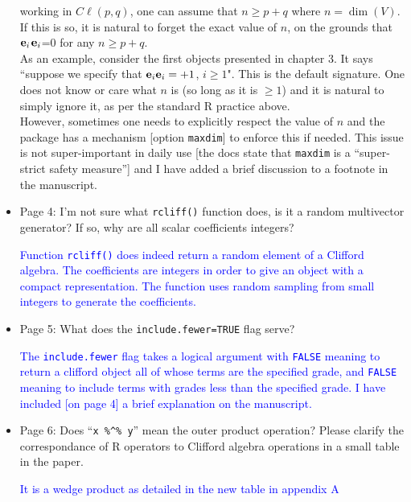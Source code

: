 \documentclass{article}
\newcommand{\cliff}[1]{\ensuremath{C\ell\left(#1\right)}}
\newcommand{\ei}[1]{\ensuremath{{\bf e}_{#1}}}
\begin{document}
\begin{itemize}
{working in $\cliff{p,q}$, one can assume that $n\geq p+q$ where
$n=\dim(V)$.  If this is so, it is natural to forget the exact value of
$n$, on the grounds that \ei{i}\ei{i}=0 for any $n\geq p+q$.\\
As an example, consider the first objects presented in chapter 3.  It
says ``suppose we specify that $\ei{i}\ei{i}=+1$, $i\geq 1$".  This is
the default signature.  One does not know or care what $n$ is (so long
as it is $\geq 1$) and it is natural to simply ignore it, as per
the standard R practice above.\\
However, sometimes one needs to explicitly respect the value of $n$
and the package has a mechanism [option {\tt maxdim}] to enforce this
if needed.  This issue is not super-important in daily use [the docs
  state that {\tt maxdim} is a ``super-strict safety measure''] and I
have added a brief discussion to a footnote in the manuscript.  }

\item Page 4: I'm not sure what {\tt rcliff()} function does, is it a
  random multivector generator? If so, why are all scalar coefficients
  integers?

  \textcolor{blue}{Function {\tt rcliff()} does indeed return a random
    element of a Clifford algebra.  The coefficients are integers in
    order to give an object with a compact representation.  The
    function uses random sampling from small integers to generate the
    coefficients.}

\item Page 5: What does the {\tt include.fewer=TRUE} flag serve?

  \textcolor{blue}{The {\tt include.fewer} flag takes a logical
    argument with {\tt FALSE} meaning to return a clifford object all
    of whose terms are the specified grade, and {\tt FALSE} meaning to
    include terms with grades less than the specified grade.  I have
    included [on page 4] a brief explanation on the manuscript.}
    
\item Page 6: Does ``{\tt x \%\string^\% y}'' mean the outer product
  operation?  Please clarify the correspondance of R operators to
  Clifford algebra operations in a small table in the paper.

  \textcolor{blue}{It is a wedge product as detailed in the new table
    in appendix A}

\end{itemize}
\end{document}
